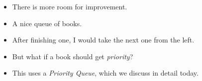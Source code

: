 \begin{frame}
\begin{columns}
\begin{center}
	\end{center}
		\begin{itemize}
			\item There is more room for improvement.
				\pause
			\item A nice \alert{queue} of books.
				\pause
			\item After finishing one, I would take the next one from the left.
				\pause
			\item But what if a book should get \textit{priority}?
				\pause
			\item This uses a \textit{Priority Queue}, which we discuss in detail today.
		\end{itemize}
	\end{columns}
\end{frame}

